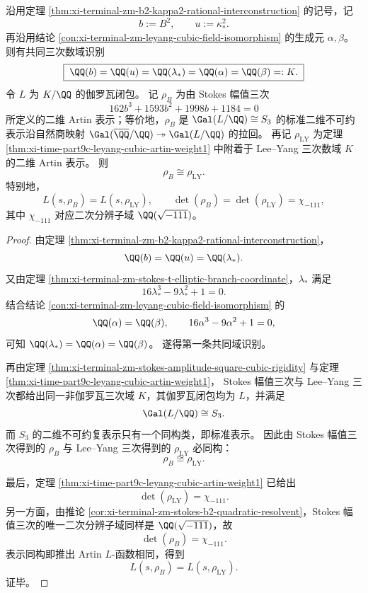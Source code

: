 \begin{theorem}\label{thm:xi-terminal-zm-stokes-leyang-shared-artin-representation}
沿用定理 \ref{thm:xi-terminal-zm-b2-kappa2-rational-interconstruction} 的记号，记
\[
b:=B^2,
\qquad
u:=\kappa_*^2.
\]
再沿用结论 \ref{con:xi-terminal-zm-leyang-cubic-field-isomorphism} 的生成元 \(\alpha,\beta\)。
则有共同三次数域识别
\[
\boxed{\;
\QQ(b)=\QQ(u)=\QQ(\lambda_*)=\QQ(\alpha)=\QQ(\beta)=:K.\;}
\]
令 \(L\) 为 \(K/\QQ\) 的伽罗瓦闭包。
记 \(\rho_B\) 为由 Stokes 幅值三次
\[
162b^3+1593b^2+1998b+1184=0
\]
所定义的二维 Artin 表示；等价地，\(\rho_B\) 是 \(\Gal(L/\QQ)\cong S_3\) 的标准二维不可约表示沿自然商映射
\(\Gal(\overline\QQ/\QQ)\twoheadrightarrow \Gal(L/\QQ)\)
的拉回。
再记 \(\rho_{\mathrm{LY}}\) 为定理 \ref{thm:xi-time-part9c-leyang-cubic-artin-weight1} 中附着于 Lee--Yang 三次数域 \(K\) 的二维 Artin 表示。
则
\[
\boxed{\;\rho_B\cong \rho_{\mathrm{LY}}.\;}
\]
特别地，
\[
L(s,\rho_B)=L(s,\rho_{\mathrm{LY}}),
\qquad
\det(\rho_B)=\det(\rho_{\mathrm{LY}})=\chi_{-111},
\]
其中 \(\chi_{-111}\) 对应二次分辨子域 \(\QQ(\sqrt{-111})\)。
\end{theorem}
\begin{proof}
由定理 \ref{thm:xi-terminal-zm-b2-kappa2-rational-interconstruction}，
\[
\QQ(b)=\QQ(u)=\QQ(\lambda_*).
\]
又由定理 \ref{thm:xi-terminal-zm-stokes-t-elliptic-branch-coordinate}，\(\lambda_*\) 满足
\[
16\lambda_*^3-9\lambda_*^2+1=0.
\]
结合结论 \ref{con:xi-terminal-zm-leyang-cubic-field-isomorphism} 的
\[
\QQ(\alpha)=\QQ(\beta),
\qquad
16\alpha^3-9\alpha^2+1=0,
\]
可知 \(\QQ(\lambda_*)=\QQ(\alpha)=\QQ(\beta)\)。
遂得第一条共同域识别。

再由定理 \ref{thm:xi-terminal-zm-stokes-amplitude-square-cubic-rigidity} 与定理 \ref{thm:xi-time-part9c-leyang-cubic-artin-weight1}，
Stokes 幅值三次与 Lee--Yang 三次都给出同一非伽罗瓦三次域 \(K\)，其伽罗瓦闭包均为 \(L\)，并满足
\[
\Gal(L/\QQ)\cong S_3.
\]
而 \(S_3\) 的二维不可约复表示只有一个同构类，即标准表示。
因此由 Stokes 幅值三次得到的 \(\rho_B\) 与 Lee--Yang 三次得到的 \(\rho_{\mathrm{LY}}\) 必同构：
\[
\rho_B\cong \rho_{\mathrm{LY}}.
\]

最后，定理 \ref{thm:xi-time-part9c-leyang-cubic-artin-weight1} 已给出
\[
\det(\rho_{\mathrm{LY}})=\chi_{-111}.
\]
另一方面，由推论 \ref{cor:xi-terminal-zm-stokes-b2-quadratic-resolvent}，Stokes 幅值三次的唯一二次分辨子域同样是 \(\QQ(\sqrt{-111})\)，故
\[
\det(\rho_B)=\chi_{-111}.
\]
表示同构即推出 Artin \(L\)-函数相同，得到
\[
L(s,\rho_B)=L(s,\rho_{\mathrm{LY}}).
\]
证毕。
\end{proof}

